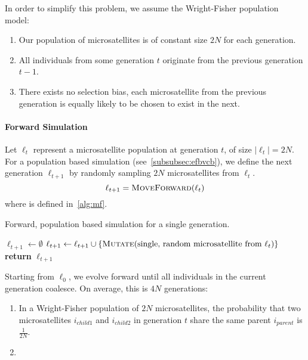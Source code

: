 In order to simplify this problem, we assume the Wright-Fisher population model:
\begin{enumerate}
    \item Our population of microsatellites is of constant size $2N$ for each generation.
    \item All individuals from some generation $t$ originate from the previous generation $t - 1$.
    \item There exists no selection bias, each microsatellite from the previous generation is equally likely to be
        chosen to exist in the next.
\end{enumerate}

\paragraph{Forward Simulation}
Let $\ell_t$ represent a microsatellite population at generation $t$, of size $|\ell_t| = 2N$.
For a population based simulation (see~\autoref{subsubsec:efbvcb}), we define the next generation $\ell_{t+1}$ by
randomly sampling $2N$ microsatellites from $\ell_t$.
\begin{equation}
    \ell_{t + 1} = \Call{MoveForward}{\ell_t}
\end{equation}
where  is defined in~\autoref{alg:mf}.
\begin{algorithm}[t]
    \caption{Forward, population based simulation for a single generation.}\label{alg:mf}
    \begin{algorithmic}[1]
            \State $\ell_{t + 1} \gets \emptyset$
                \State $\ell_{t + 1} \gets \ell_{t + 1} \cup \{ \Call{Mutate}{\text{single, random microsatellite from }
                    \ell_t }\}$
            \EndFor
            \State \textbf{return } $\ell_{t + 1}$
        \EndFunction
    \end{algorithmic}
\end{algorithm}

Starting from $\ell_0$, we evolve forward until all individuals in the current generation coalesce.
On average, this is $4N$ generations:
\begin{enumerate}
    \item In a Wright-Fisher population of $2N$ microsatellites, the probability that two microsatellites
        $i_{child1}$ and $i_{child2}$ in generation $t$ share the same parent $i_{parent}$ is $\frac{1}{2N}$.
    \item
\end{enumerate}


